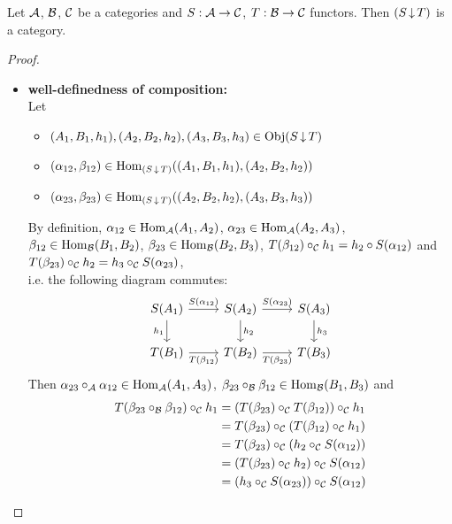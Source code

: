 \documentclass{book}
\begin{document}
	\begin{ex} 
		Let $\mathcal{A}$, $\mathcal{B}$, $\mathcal{C}$ be a categories and $S: \mathcal{A} \rightarrow \mathcal{C}$, $T: \mathcal{B} \rightarrow \mathcal{C}$ functors. Then $(S \operatorname{\downarrow} T)$ is a category.
	\end{ex}
	
	\begin{proof}\
		\begin{itemize}
			\item \textbf{well-definedness of composition:} \\
			Let 
			\begin{itemize}
				\item $(A_1, B_1, h_1), (A_2, B_2, h_2), (A_3, B_3, h_3) \in \operatorname{Obj}(S \operatorname{\downarrow} T)$
				\item $(\alpha_{12}, \beta_{12}) \in \operatorname{Hom}_{(S \operatorname{\downarrow} T)}((A_1, B_1, h_1), (A_2, B_2, h_2))$ 
				\item $(\alpha_{23}, \beta_{23}) \in \operatorname{Hom}_{(S \operatorname{\downarrow} T)}((A_2, B_2, h_2), (A_3, B_3, h_3))$
			\end{itemize}
			By definition, $\alpha_{12} \in \operatorname{Hom}_{\mathcal{A}}(A_1, A_2)$, $\alpha_{23} \in \operatorname{Hom}_{\mathcal{A}}(A_2, A_3)$, $\beta_{12} \in \operatorname{Hom}_{\mathcal{B}}(B_1, B_2)$, $\beta_{23} \in \operatorname{Hom}_{\mathcal{B}}(B_2, B_3)$, $T(\beta_{12}) \circ_{\mathcal{C}} h_1 = h_2 \circ S(\alpha_{12})$ and $T(\beta_{23}) \circ_{\mathcal{C}} h_2 = h_3 \circ_{\mathcal{C}} S(\alpha_{23})$, \\
			i.e. the following diagram commutes:
			\[ 
			\begin{tikzcd}
				S(A_1) \arrow[r, "S(\al_{12})"] \arrow[d, "h_1"'] & S(A_2)  \arrow[d, "h_2"] \arrow[r, "S(\al_{23})"] 
				& S(A_3) \arrow[d, "h_3"]\\
				T(B_1) \arrow[r, "T(\be_{12})"']                  & T(B_2)                   \arrow[r, "T(\be_{23})"'] 
				& T(B_3) 
			\end{tikzcd}
			\]
			Then $\alpha_{23} \circ_{\mathcal{A}} \alpha_{12} \in \operatorname{Hom}_{\mathcal{A}}(A_1, A_3)$, $\beta_{23} \circ_{\mathcal{B}} \beta_{12} \in \operatorname{Hom}_{\mathcal{B}}(B_1, B_3)$ and 
			\begin{align*}
				T(\be_{23} \circ_{\MB} \be_{12}) \circ_{\MC} h_1
				& = (T(\be_{23}) \circ_{\MC} T(\be_{12})) \circ_{\MC} h_1 \\
				& = T(\be_{23}) \circ_{\MC} (T(\be_{12}) \circ_{\MC} h_1) \\
				& = T(\be_{23}) \circ_{\MC} (h_2 \circ_{\MC} S(\al_{12})) \\
				& = (T(\be_{23}) \circ_{\MC} h_2) \circ_{\MC} S(\al_{12}) \\
				& = (h_3 \circ_{\MC} S(\al_{23})) \circ_{\MC} S(\al_{12}) \\

\end{align*}
\end{itemize}
\end{proof}
\end{document}
